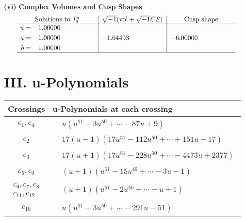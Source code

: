 \documentclass[1p]{elsarticle_modified}
\theoremstyle{definition}
\newcommand{\I}{\sqrt{-1}}
\begin{document}
\newpage\flushleft \textbf{(vi) Complex Volumes and Cusp Shapes}
$$\begin{array}{c|c|c}  
\text{Solutions to }I^u_{2}& \I (\text{vol} + \sqrt{-1}CS) & \text{Cusp shape}\\
 \hline 
\begin{aligned}
u &= -1.00000\phantom{ +0.000000I} \\
a &= \phantom{-}1.00000\phantom{ +0.000000I} \\
b &= \phantom{-}1.00000\phantom{ +0.000000I}\end{aligned}
 & -1.64493\phantom{ +0.000000I} & -6.00000\phantom{ +0.000000I}\\
 \hline 
 \end{array}$$\newpage
\newpage\renewcommand{\arraystretch}{1}
\centering \section*{ III. u-Polynomials}
\begin{tabular}{m{50pt}|m{274pt}}
Crossings & \hspace{64pt}u-Polynomials at each crossing \\
\hline $$\begin{aligned}c_{1},c_{4}\end{aligned}$$&$\begin{aligned}
&u(u^{51}-3 u^{50}+\cdots-87 u+9)
\end{aligned}$\\
\hline $$\begin{aligned}c_{2}\end{aligned}$$&$\begin{aligned}
&17(u-1)(17 u^{51}-112 u^{50}+\cdots+151 u-17)
\end{aligned}$\\
\hline $$\begin{aligned}c_{3}\end{aligned}$$&$\begin{aligned}
&17(u+1)(17 u^{51}-228 u^{50}+\cdots-4473 u+2377)
\end{aligned}$\\
\hline $$\begin{aligned}c_{5},c_{9}\end{aligned}$$&$\begin{aligned}
&(u+1)(u^{51}-15 u^{49}+\cdots-3 u-1)
\end{aligned}$\\
\hline $$\begin{aligned}c_{6},c_{7},c_{8}\\c_{11},c_{12}\end{aligned}$$&$\begin{aligned}
&(u+1)(u^{51}-2 u^{50}+\cdots- u+1)
\end{aligned}$\\
\hline $$\begin{aligned}c_{10}\end{aligned}$$&$\begin{aligned}
&u(u^{51}+3 u^{50}+\cdots-291 u-51)
\end{aligned}$\\
\hline
\end{tabular}\newpage\renewcommand{\arraystretch}{1}
\end{document}
